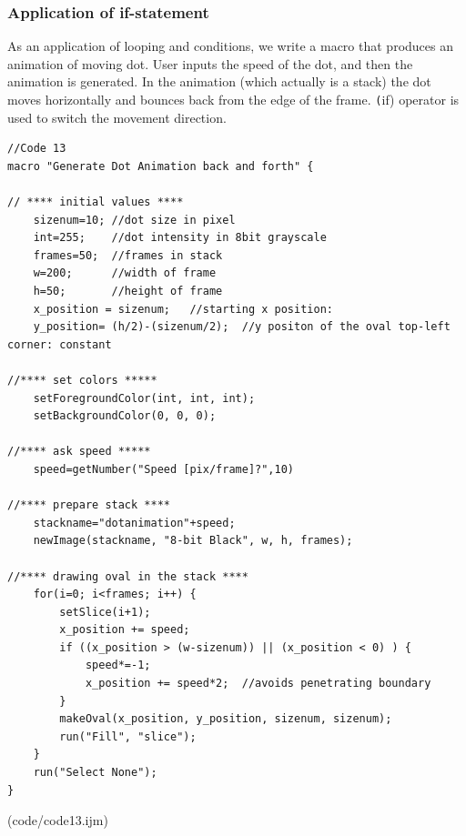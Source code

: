 \documentclass[11pt,a4paper,oneside]{report}
\newcommand{\ilcom}[1]{\texttt{\small#1}}
\begin{document}
\subsubsection{Application of if-statement}
\label{sec:dotmove}

As an application of looping and conditions, we write a macro that produces an animation of moving dot. User inputs the speed of the dot, and then the animation is generated. 
In the animation (which actually is a stack) the dot moves horizontally and bounces back from the edge
of the frame. 
\ilcom(if) operator is used to switch the movement direction.

\begin{lstlisting}[morekeywords={*, setForegroundColor, setBackgroundColor, if}]
//Code 13
macro "Generate Dot Animation back and forth" {

// **** initial values ****
	sizenum=10;	//dot size in pixel
	int=255;	//dot intensity in 8bit grayscale
	frames=50;	//frames in stack
	w=200;		//width of frame 
	h=50;		//height of frame 
	x_position = sizenum;	//starting x position: 
	y_position= (h/2)-(sizenum/2);	//y positon of the oval top-left corner: constant

//**** set colors *****
	setForegroundColor(int, int, int);
	setBackgroundColor(0, 0, 0);

//**** ask speed *****
	speed=getNumber("Speed [pix/frame]?",10)

//**** prepare stack ****
	stackname="dotanimation"+speed;	
	newImage(stackname, "8-bit Black", w, h, frames);

//**** drawing oval in the stack ****
	for(i=0; i<frames; i++) {
		setSlice(i+1);
		x_position += speed;
		if ((x_position > (w-sizenum)) || (x_position < 0) ) { 
			speed*=-1;
			x_position += speed*2;  //avoids penetrating boundary
		}
		makeOval(x_position, y_position, sizenum, sizenum);
		run("Fill", "slice");
	}
	run("Select None");
}

\end{lstlisting}
(code/code13.ijm)
\end{document}
